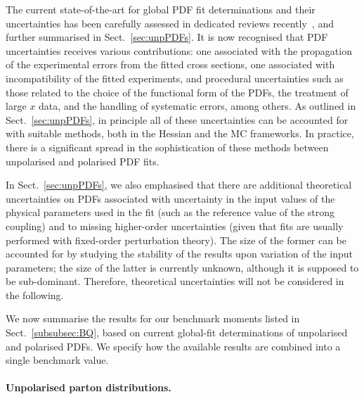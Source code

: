 The current state-of-the-art for global PDF fit determinations and their 
uncertainties has been carefully assessed in dedicated reviews
recently~\cite{Forte:2013wc,Jimenez-Delgado:2013sma}, and further 
summarised in Sect.~\ref{sec:unpPDFs}. 
%
It is now recognised that PDF uncertainties receives various contributions: 
one associated with the propagation of the
experimental errors from the fitted cross sections,
one associated with incompatibility of the 
fitted experiments, and procedural uncertainties such as those related to the choice of the
functional form of the PDFs, 
the treatment of large $x$ data, 
 and the handling of systematic errors, among others.
%
As outlined in Sect.~\ref{sec:unpPDFs}, in principle all of these uncertainties 
can be accounted for with suitable methods, both in the Hessian and the 
MC frameworks.
%
In practice, there is a significant spread in the sophistication 
of these methods between unpolarised and polarised PDF fits.

In Sect.~\ref{sec:unpPDFs}, we also emphasised that there are additional 
theoretical uncertainties on PDFs associated with uncertainty in
the input values of the physical parameters used in the fit (such as the 
reference value of the strong coupling) and to missing higher-order
uncertainties (given that fits are usually performed with fixed-order
perturbation theory).
%
The size of the former can be accounted for by studying the stability of the 
results upon variation of the input parameters; the size of the latter is
currently unknown, although it is supposed to be sub-dominant.
%
Therefore, theoretical uncertainties will not be considered in the following.

We now summarise the results for our benchmark moments listed in 
Sect.~\ref{subsubsec:BQ}, based on current global-fit determinations of
unpolarised and polarised PDFs.
%
We specify how the
available results are combined into a single benchmark value.

\paragraph{Unpolarised parton distributions.}

